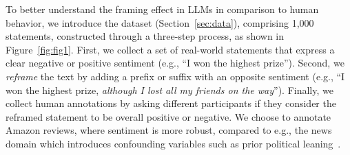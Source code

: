 







To better understand the framing effect in LLMs in comparison to human behavior,
we introduce the \name{} dataset (Section~\ref{sec:data}), comprising 1,000 statements, constructed through a three-step process, as shown in Figure~\ref{fig:fig1}.
First, we collect a set of real-world statements that express a clear negative or positive sentiment (e.g., ``I won the highest prize'').
Second, we \emph{reframe} the text by adding a prefix or suffix with an opposite sentiment (e.g., ``I won the highest prize, \emph{although I lost all my friends on the way}'').
Finally, we collect human annotations by asking different participants
if they consider the reframed statement to be overall positive or negative.
We choose to annotate Amazon reviews, where sentiment is more robust, compared to e.g., the news domain which introduces confounding variables such as prior political leaning~\cite{druckman2004political}.


